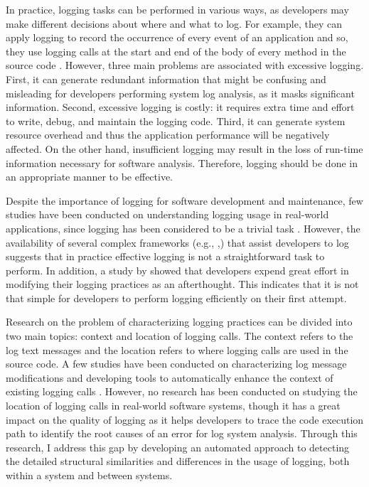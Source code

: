 In practice, logging tasks can be performed in various ways, as developers may make different decisions about where and what to log. For example, they can apply logging to record the occurrence of every event of an application and so, they use logging calls at the start and end of the body of every method in the source code \cite{clarke1999dimension,clarke1999subject}. However, three main problems are associated with excessive logging. First, it can generate redundant information that might be confusing and misleading for developers performing system log analysis, as it masks significant information. Second, excessive logging is costly: it requires extra time and effort to write, debug, and maintain the logging code. Third, it can generate system resource overhead and thus the application performance will be negatively affected. On the other hand, insufficient logging may result in the loss of run-time information necessary for software analysis. Therefore, logging should be done in an appropriate manner to be effective.

Despite the importance of logging for software development and maintenance, few studies have been conducted on understanding logging usage in real-world applications, since logging has been considered to be a trivial task \cite{clarke1999dimension,clarke1999subject}. However, the availability of several complex frameworks (e.g., ,) that assist developers to log suggests that in practice effective logging is not a straightforward task to perform. In addition, a study by \citet{yuan2012characterizing} showed that developers expend great effort in modifying their logging practices as an afterthought. This indicates that it is not that simple for developers to perform logging efficiently on their first attempt.

Research on the problem of characterizing logging practices can be divided into two main topics: context and location of logging calls. The context refers to the log text messages and the location refers to where logging calls are used in the source code. A few studies have been conducted on characterizing log message modifications \cite{yuan2012characterizing} and developing tools to automatically enhance the context of existing logging calls \cite{yuan2012improving, yuan2010sherlog}. However, no research has been conducted on studying the location of logging calls in real-world software systems, though it has a great impact on the quality of logging as it helps developers to trace the code execution path to identify the root causes of an error for log system analysis. Through this research, I address this gap by developing an automated approach to detecting the detailed structural similarities and differences in the usage of logging, both within a system and between systems.


